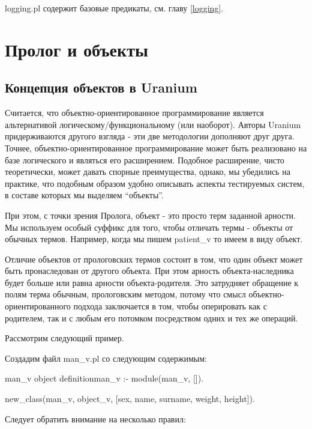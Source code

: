 \documentclass[a4paper]{book}
\def\ur{Uranium}
\begin{document}
\begin{description}
\item logging.pl содержит базовые предикаты, см. главу
  \ref{logging}.
\end{description}

\chapter{Пролог и объекты}
\label{ur_objects}

\section{Концепция объектов в \ur}
Считается, что объектно-ориентированное программирование является
альтернативой логическому/функциональному (или наоборот). Авторы
\ur{} придерживаются другого взгляда - эти две методологии
дополняют друг друга. Точнее, объектно-ориентированное
программирование может быть реализовано на базе логического и
являться его расширением. Подобное расширение, чисто
теоретически, может давать спорные преимущества, однако, мы
убедились на практике, что подобным образом удобно описывать
аспекты тестируемых систем, в составе которых мы выделяем
``объекты''. 

При этом, с точки зрения Пролога, объект - это просто терм
заданной арности. Мы используем особый суффикс для того, чтобы
отличать термы - объекты от обычных термов. Например, когда мы
пишем patient\_v то имеем в виду объект. 

Отличие объектов от прологовских термов состоит в том, что один
объект может быть пронаследован от другого объекта. При этом
арность объекта-наследника будет больше или равна арности
объекта-родителя. Это затрудняет обращение к полям терма обычным,
прологовским методом, потому что смысл объектно-ориентированного
подхода заключается в том, чтобы оперировать как с родителем, так
и с любым его потомком посредством одних и тех же операций.

Рассмотрим следующий пример.

Создадим файл man\_v.pl со следующим содержимым:

\begin{example}{man\_v object definition}{man_v}
:- module(man_v, []).

new_class(man_v, object_v, 
          [sex, name, surname, weight, height]).
\end{example}

Следует обратить внимание на несколько правил:
\end{document}
